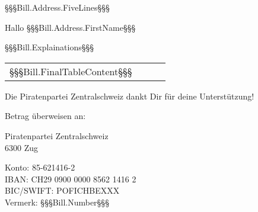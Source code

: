 ﻿\documentclass[ppsletter,fontsize=11pt,foldmarks=false ]{scrlttr2}
\begin{document}


\begin{letter}{%
    §§§Bill.Address.FiveLines§§§
}

\enlargethispage{10cm}

\opening{Hallo §§§Bill.Address.FirstName§§§}

§§§Bill.Explainations§§§

\begin{tabular}{ l r r l }
§§§Bill.FinalTableContent§§§
\end{tabular}

Die Piratenpartei Zentralschweiz dankt Dir für deine Unterstützung!

\vspace{1cm}
Betrag überweisen an:

Piratenpartei Zentralschweiz \\
6300 Zug

Konto: 85-621416-2 \\
IBAN: CH29 0900 0000 8562 1416 2 \\
BIC/SWIFT: POFICHBEXXX \\
Vermerk: §§§Bill.Number§§§

\end{letter}%
\end{document}
